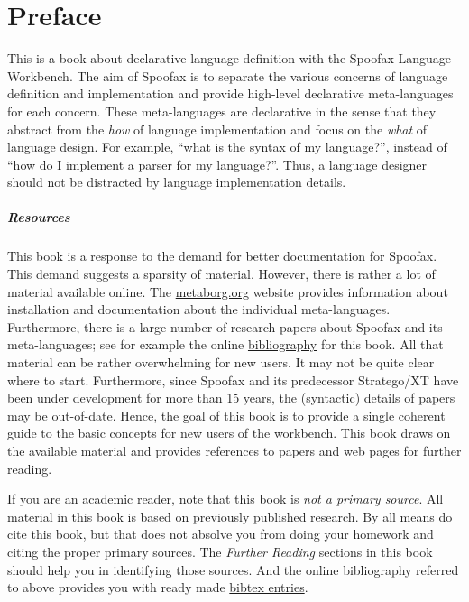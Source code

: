 \chapter*{Preface}

This is a book about declarative language definition with the Spoofax Language
Workbench.
The aim of Spoofax is to separate the various concerns of language definition
and implementation and provide high-level declarative meta-languages for each
concern.
These meta-languages are declarative in the sense that they abstract from the
\emph{how} of language implementation and focus on the \emph{what} of language
design.
For example, ``what is the syntax of my language?'', instead of ``how do I
implement a parser for my language?''.
Thus, a language designer should not be distracted by language implementation
details. 

\paragraph{Resources}

This book is a response to the demand for better documentation for Spoofax. This
demand suggests a sparsity of material.
However, there is rather a lot of material available online. The
\href{http://metaborg.org}{metaborg.org} website provides information about
installation and documentation about the individual meta-languages. 
Furthermore, there is a large number of research papers about Spoofax and its
meta-languages; see for example the online
\href{http://researchr.org/bibliography/metaborg-book/publications}{bibliography}
for this book.
All that material can be rather overwhelming for new users. 
It may not be quite clear where to start.
Furthermore, since Spoofax and its predecessor Stratego/XT have been
under development for more than 15 years, the (syntactic) details of
papers may be out-of-date.
Hence, the goal of this book is to provide a single coherent guide to the basic
concepts for new users of the workbench.
This book draws on the available material and provides references to papers and
web pages for further reading.

If you are an academic reader, note that this book is \emph{not a primary
source}. All material in this book is based on previously published research. By
all means do cite this book, but that does not absolve you from doing
your homework and citing the proper primary sources. The \emph{Further Reading}
sections in this book should help you in identifying those sources. And the
online bibliography referred to above provides you with ready made
\href{http://researchr.org/downloadbibtex/bibliography/metaborg-book}{bibtex
entries}.

